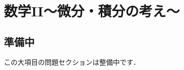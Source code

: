 \documentclass[../../ms_q.tex]{subfiles}
\begin{document}
\section{数学II～微分・積分の考え～}

\subsection*{準備中}
この大項目の問題セクションは整備中です．
\end{document}
